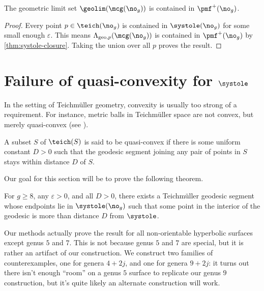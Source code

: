 \documentclass[12pt, reqno]{amsart}
\begin{document}
\begin{corollary}
  \label{cor:geolimset}
  The geometric limit set $\geolim(\mcg(\no_g))$ is contained in $\pmf^+(\no_g)$.
\end{corollary}
\begin{proof}
  Every point $p \in \teich(\no_g)$ is contained in $\systole(\no_g)$ for some small enough $\varepsilon$.
  This means $\Lambda_{\mathrm{geo}, p}(\mcg(\no_g))$ is contained in $\pmf^+(\no_g)$ by \autoref{thm:systole-closure}.
  Taking the union over all $p$ proves the result.
\end{proof}

\section{Failure of quasi-convexity for ${\systole}$}
\label{sec:fail-quasi-conv}

In the setting of Teichm\"uller geometry, convexity is usually too strong of a requirement.
For instance, metric balls in Teichm\"uller space are not convex, but merely quasi-convex (see \autocite{lenzhen2011length}).
\begin{definition}
  A subset $S$ of ${\teich(S)}$ is said to be quasi-convex if there is some uniform constant $D > 0$ such that the geodesic segment joining any pair of points in $S$ stays within distance $D$ of $S$.
\end{definition}

Our goal for this section will be to prove the following theorem.
\begin{theorem}
  \label{thm:qc-fail}
  For $g \geq 8$, any $\varepsilon > 0$, and all $D > 0$, there exists a Teichm\"uller geodesic segment whose endpoints lie in ${\systole}(\no_g)$ such that some point in the interior of the geodesic is more than distance $D$ from $\systole$.
\end{theorem}

\begin{remark}
  Our methods actually prove the result for all non-orientable hyperbolic surfaces except genus $5$ and $7$.
  This is not because genus $5$ and $7$ are special, but it is rather an artifact of our construction.
  We construct two families of counterexamples, one for genera $4+2j$, and one for genera $9+2j$: it turns out there isn't enough ``room'' on a genus $5$ surface to replicate our genus $9$ construction, but it's quite likely an alternate construction will work.
\end{remark}
\end{document}
